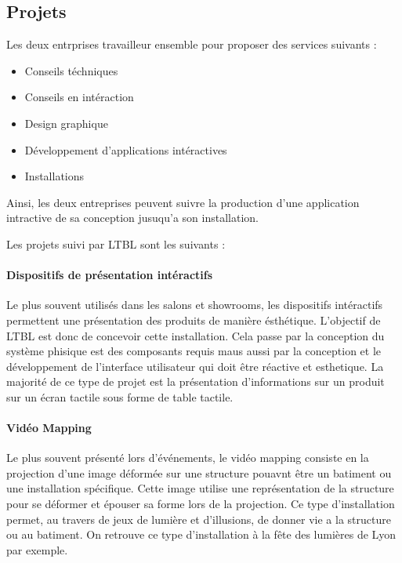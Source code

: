 \documentclass{article}
\begin{document}
\subsection{Projets}

Les deux entrprises travailleur ensemble pour proposer des services suivants :

\begin{itemize}
    \item Conseils téchniques
    \item Conseils en intéraction
    \item Design graphique
    \item Développement d'applications intéractives
    \item Installations
\end{itemize}

Ainsi, les deux entreprises peuvent suivre la production d'une application intractive de sa conception jusuqu'a son installation.

\medskip

Les projets suivi par LTBL sont les suivants :

\paragraph{Dispositifs de présentation intéractifs} Le plus souvent utilisés dans les salons et showrooms, les dispositifs intéractifs permettent une présentation des produits de manière ésthétique.
L'objectif de LTBL est donc de concevoir cette installation.
Cela passe par la conception du système phisique est des composants requis maus aussi par la conception et le développement de l'interface utilisateur qui doit être réactive et esthetique.
La majorité de ce type de projet est la présentation d'informations sur un produit sur un écran tactile sous forme de table tactile.

\paragraph{Vidéo Mapping} Le plus souvent présenté lors d'événements, le vidéo mapping consiste en la projection d'une image déformée sur une structure pouavnt être un batiment ou une installation spécifique.
Cette image utilise une représentation de la structure pour se déformer et épouser sa forme lors de la projection.
Ce type d'installation permet, au travers de jeux de lumière et d'illusions, de donner vie a la structure ou au batiment.
On retrouve ce type d'installation à la fête des lumières de Lyon par exemple.
\end{document}
